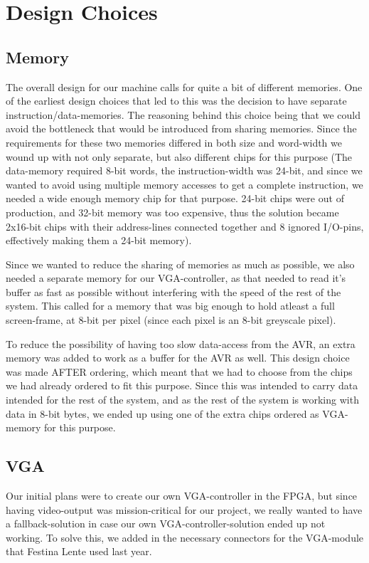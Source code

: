 \section {Design Choices}

\subsection {Memory}
The overall design for our machine calls for quite a bit of different memories. One of the
earliest design choices that led to this was the decision to have separate instruction/data-memories.
The reasoning behind this choice being that we could avoid the bottleneck that would be introduced
from sharing memories. Since the requirements for these two memories differed in both size and word-width 
we wound up with not only separate, but also different chips for this purpose (The data-memory required
8-bit words, the instruction-width was 24-bit, and since we wanted to avoid using multiple memory accesses
to get a complete instruction, we needed a wide enough memory chip for that purpose. 24-bit chips were out of
production, and 32-bit memory was too expensive, thus the solution became 2x16-bit chips with their address-lines
connected together and 8 ignored I/O-pins, effectively making them a 24-bit memory).

Since we wanted to reduce the sharing of memories as much as possible, we also needed a separate memory for
our VGA-controller, as that needed to read it's buffer as fast as possible without interfering with the speed
of the rest of the system. This called for a memory that was big enough to hold atleast a full screen-frame,
at 8-bit per pixel (since each pixel is an 8-bit greyscale pixel).

To reduce the possibility of having too slow data-access from the AVR, an extra memory was added to work as
a buffer for the AVR as well. This design choice was made AFTER ordering, which meant that we had to choose from
the chips we had already ordered to fit this purpose. Since this was intended to carry data intended for the rest
of the system, and as the rest of the system is working with data in 8-bit bytes, we ended up using one of the
extra chips ordered as VGA-memory for this purpose.

\subsection{VGA}
Our initial plans were to create our own VGA-controller in the FPGA, but since having video-output was mission-critical
for our project, we really wanted to have a fallback-solution in case our own VGA-controller-solution ended up not working.
To solve this, we added in the necessary connectors for the VGA-module that Festina Lente used last year.

